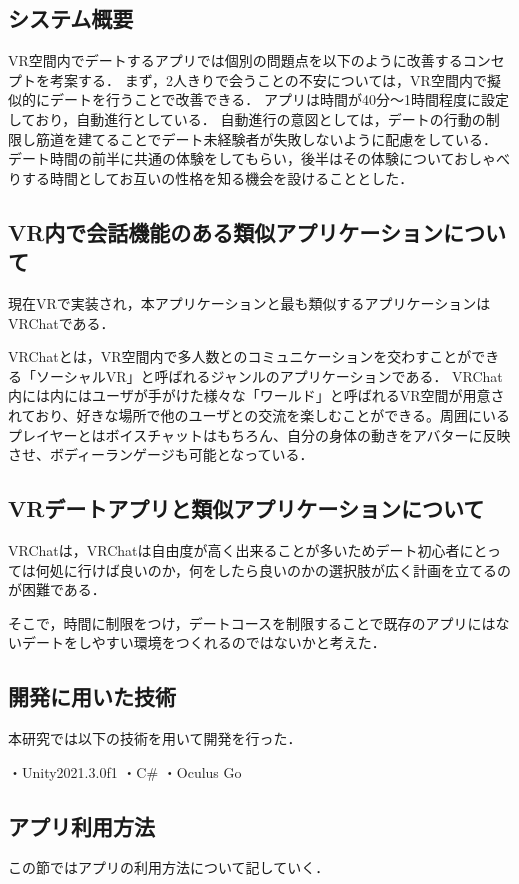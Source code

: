 \documentclass[12pt,a4j,titlepage]{ltjsarticle}
\begin{document}
\subsection{システム概要}\label{システム概要}
VR空間内でデートするアプリでは個別の問題点を以下のように改善するコンセプトを考案する．
まず，2人きりで会うことの不安については，VR空間内で擬似的にデートを行うことで改善できる．
アプリは時間が40分〜1時間程度に設定しており，自動進行としている．
自動進行の意図としては，デートの行動の制限し筋道を建てることでデート未経験者が失敗しないように配慮をしている．
デート時間の前半に共通の体験をしてもらい，後半はその体験についておしゃべりする時間としてお互いの性格を知る機会を設けることとした．

\subsection{VR内で会話機能のある類似アプリケーションについて} 
現在VRで実装され，本アプリケーションと最も類似するアプリケーションはVRChatである．

VRChatとは，VR空間内で多人数とのコミュニケーションを交わすことができる「ソーシャルVR」と呼ばれるジャンルのアプリケーションである．
VRChat内には内にはユーザが手がけた様々な「ワールド」と呼ばれるVR空間が用意されており、好きな場所で他のユーザとの交流を楽しむことができる。周囲にいるプレイヤーとはボイスチャットはもちろん、自分の身体の動きをアバターに反映させ、ボディーランゲージも可能となっている．
\subsection{VRデートアプリと類似アプリケーションについて}
VRChatは，VRChatは自由度が高く出来ることが多いためデート初心者にとっては何処に行けば良いのか，何をしたら良いのかの選択肢が広く計画を立てるのが困難である．

そこで，時間に制限をつけ，デートコースを制限することで既存のアプリにはないデートをしやすい環境をつくれるのではないかと考えた．

\subsection{開発に用いた技術}
本研究では以下の技術を用いて開発を行った．

・Unity2021.3.0f1
・C\#
・Oculus Go

\clearpage

\subsection{アプリ利用方法}
この節ではアプリの利用方法について記していく．
\end{document}
